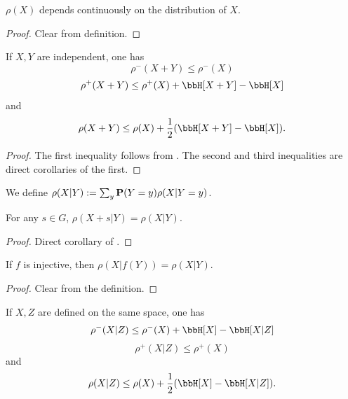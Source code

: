 \begin{lemma}\label{rho-cts}\leanok $\rho(X)$ depends continuously on the distribution of $X$.
\end{lemma}

\begin{proof}  \leanok Clear from definition.
\end{proof}

\begin{lemma}\label{rho-sums}\leanok  If $X,Y$ are independent, one has
  $$ \rho^-(X+Y) \leq \rho^-(X)$$
  $$ \rho^+(X+Y) \leq \rho^+(X) + \bbH[X+Y] - \bbH[X]$$
and
  $$ \rho(X+Y) \leq \rho(X) + \frac{1}{2}( \bbH[X+Y] - \bbH[X] ).$$
\end{lemma}

\begin{proof}\leanok
The first inequality follows from . The second and third inequalities are direct corollaries of the first.
\end{proof}


\begin{definition}\label{rho-cond-def}\leanok We define $\rho(X|Y) := \sum_y {\bf P}(Y=y) \rho(X|Y=y)$.
\end{definition}

\begin{lemma}\label{rho-cond-invariant}\leanok
  For any $s\in G$, $\rho(X+s|Y)=\rho(X|Y)$.
\end{lemma}
\begin{proof}\leanok
  Direct corollary of .
\end{proof}

\begin{lemma}\label{rho-cond-relabeled}\leanok
  If $f$ is injective, then $\rho(X|f(Y))=\rho(X|Y)$.
\end{lemma}
\begin{proof}\leanok
  Clear from the definition.
\end{proof}

\begin{lemma}\label{rho-cond}\leanok  If $X,Z$ are defined on the same space, one has
  $$ \rho^-(X|Z) \leq \rho^-(X) + \bbH[X] - \bbH[X|Z]$$
  $$ \rho^+(X|Z) \leq \rho^+(X)$$
and
  $$ \rho(X|Z) \leq \rho(X) + \frac{1}{2}( \bbH[X] - \bbH[X|Z] ).$$
\end{lemma}


